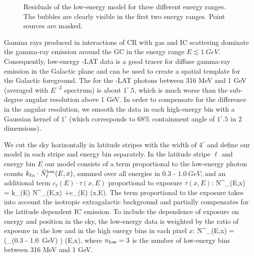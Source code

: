 \begin{figure}[t]
{\begin{subfigure}{0.3\textwidth}
    	\end{subfigure}
    }
  	\caption{Residuals of the low-energy model for three different energy ranges. The \Fermi bubbles are clearly visible in the first two energy ranges. Point sources are masked.}
  	\label{fig:Maps_lowE}
\end{figure}

Gamma rays produced in interactions of CR with gas and IC scattering dominate the gamma-ray emission around the GC in the energy range $E \lesssim \SI{1}{GeV}$. 
Consequently, low-energy \Fermi-LAT data is a good tracer for diffuse gamma-ray emission in the Galactic plane and can be used to create a spatial template for the Galactic foreground.
The  for the \Fermi-LAT photons between 316 MeV and 1 GeV (averaged with $E^{-2}$ spectrum) is about $1^\circ\!\!.5$,
which is much worse than the sub-degree angular resolution above 1 GeV.
In order to compensate for the difference in the angular resolution, 
we smooth the data in each high-energy bin with a Gaussian kernel of $1^\circ$ (which corresponds to $68\%$ containment angle of
$1^\circ\!\!.5$ in 2 dimensions).

We cut the sky horizontally in latitude stripes with the width of $4^\circ$ and define our model in each stripe and energy bin separately. 
In the latitude stripe $\ell$ and energy bin $E$ our model consists of a term proportional to the low-energy photon counts $k_{\ell\alpha} \cdot \tilde N^{\text{low}}_\ell(E,x)$, summed over all energies in 0.3 - $\SI{1.0}{GeV}$, and an additional term $c_\ell(E) \cdot \tau(x,E)$ proportional to exposure $\tau(x,E)$:
\be
N^\model_{\ell}(E,x) = k_{\ell}(E) \cdot \tilde N^\low_{\ell}(E,x) +c_\ell(E) \cdot \tau(x,E).
\ee
The term proportional to the exposure takes into account the isotropic extragalactic background and partially compensates for the latitude dependent IC emission. To include the dependence of exposure on energy and position in the sky, the low-energy data is weighted by the ratio of exposure in the low and
in the high energy bins in each pixel $x$:
\be
\tilde N^\model_\ell(E,x) =  \left(\sum_{\epsilon \in (0.3 - \SI{1.0}{GeV})} \right) \cdot \tau(E,x),
\ee
where $n_{\text{low}} = 3$ is the number of low-energy bins between 316 MeV and 1 GeV.


